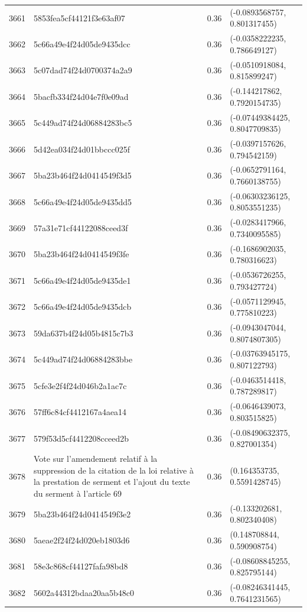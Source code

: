 \begin{table}[ht]
\begin{tabular}{rlrl}
  3661 & 5853fea5cf44121f3e63af07 & 0.36 & (-0.0893568757, 0.801317455) \\ 
  3662 & 5c66a49e4f24d05de9435dcc & 0.36 & (-0.0358222235, 0.786649127) \\ 
  3663 & 5c07dad74f24d0700374a2a9 & 0.36 & (-0.0510918084, 0.815899247) \\ 
  3664 & 5bacfb334f24d04e7f0e09ad & 0.36 & (-0.144217862, 0.7920154735) \\ 
  3665 & 5c449ad74f24d06884283bc5 & 0.36 & (-0.07449384425, 0.8047709835) \\ 
  3666 & 5d42ea034f24d01bbccc025f & 0.36 & (-0.0397157626, 0.794542159) \\ 
  3667 & 5ba23b464f24d0414549f3d5 & 0.36 & (-0.0652791164, 0.7660138755) \\ 
  3668 & 5c66a49e4f24d05de9435dd5 & 0.36 & (-0.06303236125, 0.8053551235) \\ 
  3669 & 57a31e71cf44122088ceed3f & 0.36 & (-0.0283417966, 0.7340095585) \\ 
  3670 & 5ba23b464f24d0414549f3fe & 0.36 & (-0.1686902035, 0.780316623) \\ 
  3671 & 5c66a49e4f24d05de9435de1 & 0.36 & (-0.0536726255, 0.793427724) \\ 
  3672 & 5c66a49e4f24d05de9435dcb & 0.36 & (-0.0571129945, 0.775810223) \\ 
  3673 & 59da637b4f24d05b4815c7b3 & 0.36 & (-0.0943047044, 0.8074807305) \\ 
  3674 & 5c449ad74f24d06884283bbe & 0.36 & (-0.03763945175, 0.807122793) \\ 
  3675 & 5cfe3e2f4f24d046b2a1ac7c & 0.36 & (-0.0463514418, 0.787289817) \\ 
  3676 & 57ff6c84cf4412167a4aea14 & 0.36 & (-0.0646439073, 0.803515825) \\ 
  3677 & 579f53d5cf4412208cceed2b & 0.36 & (-0.08490632375, 0.827001354) \\ 
  3678 & Vote sur l'amendement relatif à la suppression de la citation de la loi relative à la prestation de serment et l'ajout du texte du serment à l'article 69 & 0.36 & (0.164353735, 0.5591428745) \\ 
  3679 & 5ba23b464f24d0414549f3e2 & 0.36 & (-0.133202681, 0.802340408) \\ 
  3680 & 5aeae2f24f24d020eb1803d6 & 0.36 & (0.148708844, 0.590908754) \\ 
  3681 & 58e3c868cf44127fafa98bd8 & 0.36 & (-0.08608845255, 0.825795144) \\ 
  3682 & 5602a44312bdaa20aa5b48c0 & 0.36 & (-0.08246341445, 0.7641231565) \\ 

\end{tabular}
\end{table}
